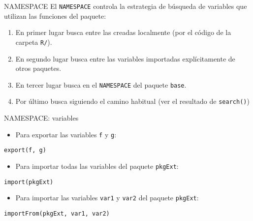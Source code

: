 \documentclass[xcolor={usenames,svgnames,dvipsnames}]{beamer}
\begin{document}
\begin{frame}[label={sec:org075080a},fragile]{NAMESPACE}
 El \texttt{NAMESPACE} controla la estrategia de búsqueda de variables
  que utilizan las funciones del paquete:
\begin{enumerate}
\item En primer lugar busca entre las creadas localmente (por el código de la carpeta \texttt{R/}).
\item En segundo lugar busca entre las variables importadas
explícitamente de otros paquetes.
\item En tercer lugar busca en el \texttt{NAMESPACE} del paquete \texttt{base}.
\item Por último busca siguiendo el camino habitual (ver el
resultado de \texttt{search()})
\end{enumerate}
\end{frame}

\begin{frame}[label={sec:org222f55b},fragile]{NAMESPACE: variables}
 \begin{itemize}
\item Para exportar las variables \texttt{f} y \texttt{g}:
\end{itemize}
\lstset{language=r,label= ,caption= ,captionpos=b,numbers=none}
\begin{lstlisting}
export(f, g)
\end{lstlisting}
\begin{itemize}
\item Para importar \alert{todas} las variables del paquete \texttt{pkgExt}:
\end{itemize}
\lstset{language=r,label= ,caption= ,captionpos=b,numbers=none}
\begin{lstlisting}
import(pkgExt)
\end{lstlisting}
\begin{itemize}
\item Para importar las variables \texttt{var1} y \texttt{var2} del paquete
\texttt{pkgExt}:
\end{itemize}
\lstset{language=r,label= ,caption= ,captionpos=b,numbers=none}
\begin{lstlisting}
importFrom(pkgExt, var1, var2)
\end{lstlisting}
\end{frame}
\end{document}
